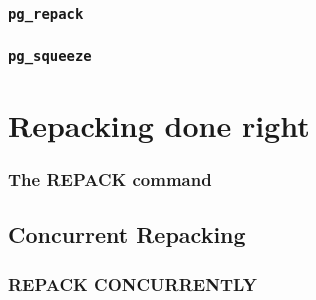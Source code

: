 \begin{frame}
	\frametitle{\texttt{pg\_repack}}
\end{frame}

\begin{frame}
	\frametitle{\texttt{pg\_squeeze}}
\end{frame}

\section{Repacking done right}
\begin{frame}
	\frametitle{The REPACK command}
\end{frame}

\subsection{Concurrent Repacking}
\begin{frame}
	\frametitle{REPACK CONCURRENTLY}
\end{frame}
